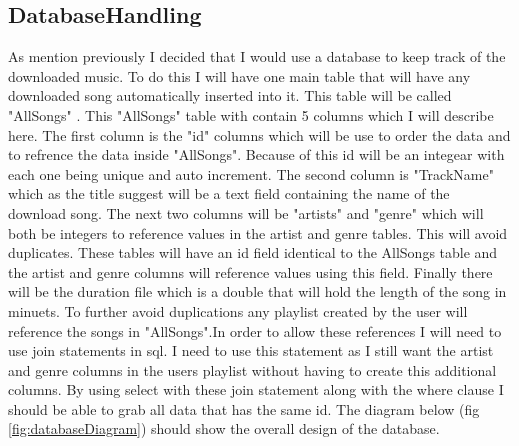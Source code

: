 \documentclass{article}
\begin{document}
\subsection{DatabaseHandling}\label{DatabaseHandling}
As mention previously I decided that I would use a database to keep track of the
downloaded music. To do this I will have one main table that will have any
downloaded song automatically inserted into it. This table will be called "AllSongs"
. This "AllSongs" table with contain 5 columns which I will describe here.
The first column is the "id" columns which will be use to order the data
and to refrence the data inside "AllSongs". Because of this id will be an
integear with each one being unique and auto increment. The second column
is "TrackName" which as the title suggest will be a text field containing
the name of the download song. The next two columns will be "artists" and
"genre" which will both be integers to reference values in the artist and
genre tables. This will avoid duplicates. These tables will have an id field
identical to the AllSongs table and the artist and genre columns will
reference values using this field. Finally there will be the duration
file which is a double that will hold the length of the song in minuets.
To further avoid duplications any playlist created by the user will reference
the songs in "AllSongs".In order to allow these references I will need to use join
statements in sql. I need to use this statement as I still want the artist and
genre columns in the users playlist without having to create this additional columns.
By using select with these join statement along with the where clause I should
be able to grab all data that has the same id. The diagram below (fig \ref{fig:databaseDiagram}) should show
the overall design of the database.
\end{document}
